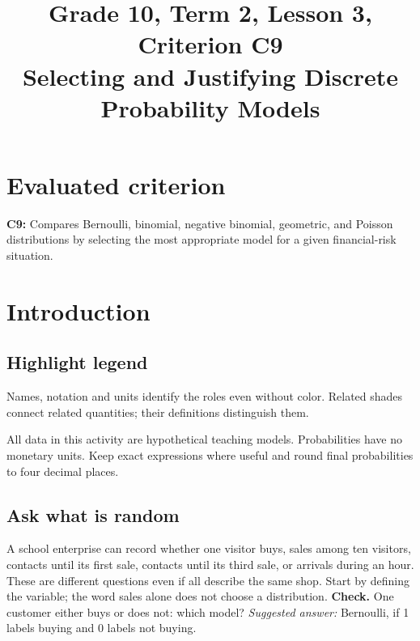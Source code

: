 \makeatletter
{}
\makeatother



\CoordinatedTermTwoPalette
\usepackage{needspace}
\setlength{\emergencystretch}{2em}
\title{Grade 10, Term 2, Lesson 3, Criterion C9\\Selecting and Justifying Discrete Probability Models}
\author{}
\date{}

\maketitle
\setcounter{tocdepth}{1}
\setcounter{secnumdepth}{2}
\label{toc}
\tableofcontents
\section*{Evaluated criterion}
\textbf{C9:} Compares Bernoulli, binomial, negative binomial, geometric, and Poisson distributions by selecting the most appropriate model for a given financial-risk situation.
\section{Introduction}\label{sec:t2-c9-introduction}
\subsection*{Highlight legend}
\label{tab:highlight-legend}
Names, notation and units identify the roles even without color. Related shades connect related quantities; their definitions distinguish them.

All data in this activity are hypothetical teaching models. Probabilities have no monetary units. Keep exact expressions where useful and round final probabilities to four decimal places.
\subsection{Ask what is random}
A school enterprise can record whether one visitor buys, sales among ten visitors, contacts until its first sale, contacts until its third sale, or arrivals during an hour. These are different questions even if all describe the same shop. Start by defining the variable; the word sales alone does not choose a distribution.
\textbf{Check.} One customer either buys or does not: which model? \emph{Suggested answer:} Bernoulli, if 1 labels buying and 0 labels not buying.


